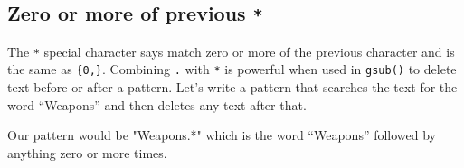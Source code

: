 \documentclass[
  12pt,
]{book}
\begin{document}
\hypertarget{zero-or-more-of-previous}{%
\subsection{\texorpdfstring{Zero or more of previous \texttt{*}}{Zero or more of previous *}}\label{zero-or-more-of-previous}}

The \texttt{*} special character says match zero or more of the previous character and is the same as \texttt{\{0,\}}. Combining \texttt{.} with \texttt{*} is powerful when used in \texttt{gsub()} to delete text before or after a pattern. Let's write a pattern that searches the text for the word ``Weapons'' and then deletes any text after that.

Our pattern would be "Weapons.*" which is the word ``Weapons'' followed by anything zero or more times.
\end{document}
